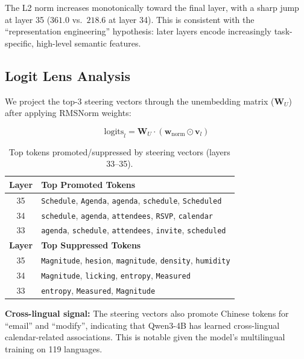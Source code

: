 \documentclass[11pt,a4paper]{article}
\begin{document}
The L2 norm increases monotonically toward the final layer, with a sharp jump at layer 35 ($361.0$ vs.\ $218.6$ at layer 34). This is consistent with the ``representation engineering'' hypothesis: later layers encode increasingly task-specific, high-level semantic features.

\subsection{Logit Lens Analysis}

We project the top-3 steering vectors through the unembedding matrix ($\mathbf{W}_U$) after applying RMSNorm weights:

$$\text{logits}_l = \mathbf{W}_U \cdot (\mathbf{w}_{\text{norm}} \odot \mathbf{v}_l)$$

\begin{table}[H]
\centering
\caption{Top tokens promoted/suppressed by steering vectors (layers 33--35).}
\label{tab:logit_lens}
\small
\begin{tabular}{cl}
\toprule
\textbf{Layer} & \textbf{Top Promoted Tokens} \\
\midrule
35 & \texttt{Schedule}, \texttt{Agenda}, \texttt{agenda}, \texttt{schedule}, \texttt{Scheduled} \\
34 & \texttt{schedule}, \texttt{agenda}, \texttt{attendees}, \texttt{RSVP}, \texttt{calendar} \\
33 & \texttt{agenda}, \texttt{schedule}, \texttt{attendees}, \texttt{invite}, \texttt{scheduled} \\
\midrule
\textbf{Layer} & \textbf{Top Suppressed Tokens} \\
\midrule
35 & \texttt{Magnitude}, \texttt{hesion}, \texttt{magnitude}, \texttt{density}, \texttt{humidity} \\
34 & \texttt{Magnitude}, \texttt{licking}, \texttt{entropy}, \texttt{Measured} \\
33 & \texttt{entropy}, \texttt{Measured}, \texttt{Magnitude} \\
\bottomrule
\end{tabular}
\end{table}

\textbf{Cross-lingual signal:} The steering vectors also promote Chinese tokens for ``email'' and ``modify'', indicating that Qwen3-4B has learned cross-lingual calendar-related associations. This is notable given the model's multilingual training on 119 languages.

\end{document}
